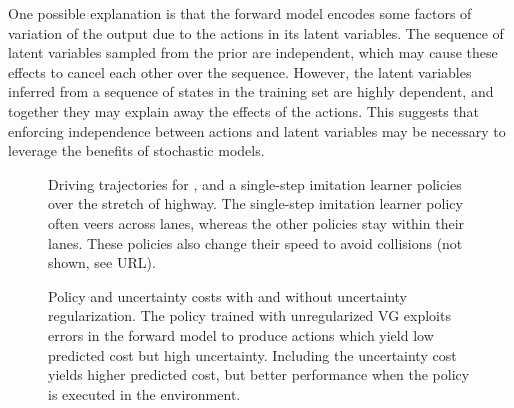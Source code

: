 \documentclass{article} %
\begin{document}
One possible explanation is that the forward model encodes some factors of variation of the output due to the actions in its latent variables.
The sequence of latent variables sampled from the prior are independent, which may cause these effects to cancel each other over the sequence. However, the latent variables inferred from a sequence of states in the training set are highly dependent, and together they may explain away the effects of the actions.
This suggests that enforcing independence between actions and latent variables may be necessary to leverage the benefits of stochastic models.





\begin{figure}[t!]
    \centering
    \caption{Driving trajectories for \modelnamedrop, \modelnameil and a single-step imitation learner policies over the stretch of highway. The single-step imitation learner policy often veers across lanes, whereas the other policies stay within their lanes. These policies also change their speed to avoid collisions (not shown, see URL).}
    \label{trajectories}
\end{figure}




\begin{figure}[t!]
    \centering
    \caption{Policy and uncertainty costs with and without uncertainty regularization. The policy trained with unregularized VG exploits errors in the forward model to produce actions which yield low predicted cost but high uncertainty. Including the uncertainty cost yields higher predicted cost, but better performance when the policy is executed in the environment.}
    \label{svg-pred}
\end{figure}
\end{document}
